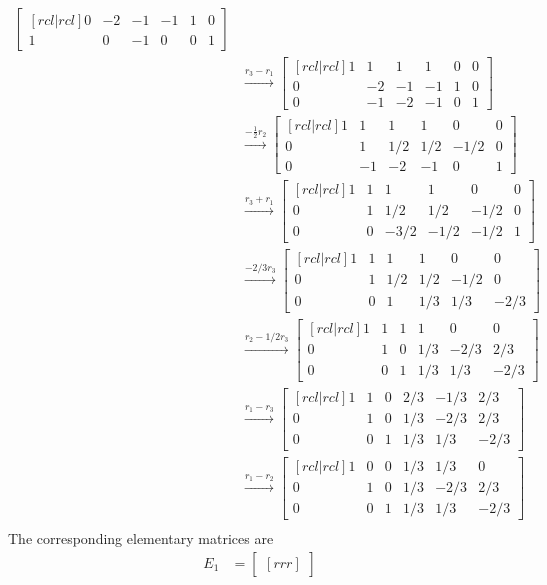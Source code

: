 \begin{solution}
\begin{align*}
\begin{bmatrix}[rcl|rcl]
0&-2&-1&-1&1&0\\
1&0&-1&0&0&1
\end{bmatrix}\\
&\xrightarrow[]{r_3-r_1}
\begin{bmatrix}[rcl|rcl]
1&1&1&1&0&0\\
0&-2&-1&-1&1&0\\
0&-1&-2&-1&0&1
\end{bmatrix}\\
&\xrightarrow[]{-\frac{1}{2}r_2}
\begin{bmatrix}[rcl|rcl]
1&1&1&1&0&0\\
0&1&1/2&1/2&-1/2&0\\
0&-1&-2&-1&0&1
\end{bmatrix}\\
&\xrightarrow[]{r_3+r_1}
\begin{bmatrix}[rcl|rcl]
1&1&1&1&0&0\\
0&1&1/2&1/2&-1/2&0\\
0&0&-3/2&-1/2&-1/2&1
\end{bmatrix}\\
&\xrightarrow[]{-2/3 r_3}
\begin{bmatrix}[rcl|rcl]
1&1&1&1&0&0\\
0&1&1/2&1/2&-1/2&0\\
0&0&1&1/3&1/3&-2/3
\end{bmatrix}\\
&\xrightarrow[]{r_2-1/2r_3}
\begin{bmatrix}[rcl|rcl]
1&1&1&1&0&0\\
0&1&0&1/3&-2/3&2/3\\
0&0&1&1/3&1/3&-2/3
\end{bmatrix}\\
&\xrightarrow[]{r_1-r_3}
\begin{bmatrix}[rcl|rcl]
1&1&0&2/3&-1/3&2/3\\
0&1&0&1/3&-2/3&2/3\\
0&0&1&1/3&1/3&-2/3
\end{bmatrix}\\
&\xrightarrow[]{r_1-r_2}
\begin{bmatrix}[rcl|rcl]
1&0&0&1/3&1/3&0\\
0&1&0&1/3&-2/3&2/3\\
0&0&1&1/3&1/3&-2/3
\end{bmatrix}\\
\end{align*}
The corresponding elementary matrices are 
\begin{align*}
E_1&=\begin{bmatrix}[rrr]

\end{bmatrix}
\end{align*}
\end{solution}
